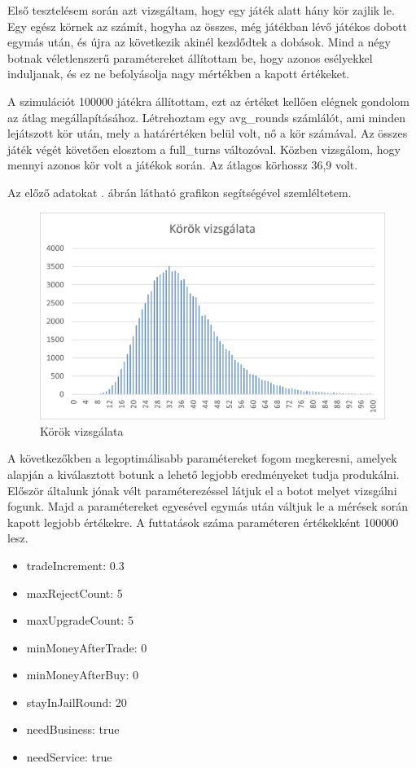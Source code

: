 
Első tesztelésem során azt vizsgáltam, hogy egy játék alatt hány kör zajlik le. Egy egész körnek az számít, hogyha az összes, még játékban lévő játékos dobott egymás után, és újra az következik akinél kezdődtek a dobások. Mind a négy botnak véletlenszerű paramétereket állítottam be, hogy azonos esélyekkel induljanak, és ez ne befolyásolja nagy mértékben a kapott értékeket.

A szimulációt 100000 játékra állítottam, ezt az értéket kellően elégnek gondolom az átlag megállapításához. Létrehoztam egy avg\_rounds számlálót, ami minden lejátszott kör után, mely a határértéken belül volt, nő a kör számával. Az összes játék végét követően elosztom a full\_turns változóval. Közben vizsgálom, hogy mennyi azonos kör volt a játékok során.  Az átlagos körhossz 36,9 volt.

Az előző adatokat . ábrán látható grafikon segítségével szemléltetem.

\begin{figure}[h!]
\centering
\includegraphics[scale=0.2]{images/Kep1.png}
\caption{Körök vizsgálata}
\label{fig:korok}
\end{figure}


A következőkben a legoptimálisabb paramétereket fogom megkeresni, amelyek alapján a kiválasztott botunk a lehető legjobb eredményeket tudja produkálni. Először általunk jónak vélt paraméterezéssel látjuk el a botot melyet vizsgálni fogunk. Majd a paramétereket egyesével egymás után váltjuk le a mérések során kapott legjobb értékekre. A futtatások száma paraméteren értékekként 100000 lesz.

\begin{itemize}
	\item tradeIncrement: 0.3
	\item maxRejectCount: 5
	\item maxUpgradeCount: 5
	\item minMoneyAfterTrade: 0
	\item minMoneyAfterBuy: 0
	\item stayInJailRound: 20
	\item needBusiness: true
	\item needService: true
\end{itemize}

